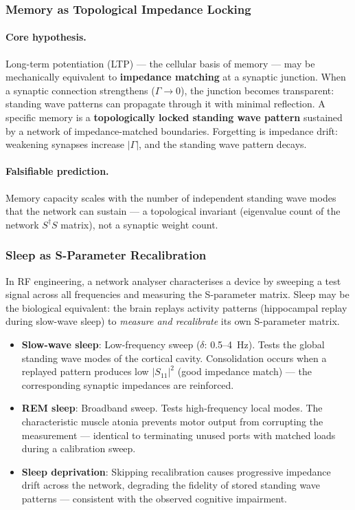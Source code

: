 \subsubsection{Memory as Topological Impedance Locking}
\label{sec:future_memory}

\paragraph{Core hypothesis.}
Long-term potentiation (LTP) --- the cellular basis of
memory --- may be mechanically equivalent to
\textbf{impedance matching} at a synaptic junction.  When
a synaptic connection strengthens ($\Gamma \to 0$), the
junction becomes transparent: standing wave patterns can
propagate through it with minimal reflection.  A specific
memory is a \textbf{topologically locked standing wave
pattern} sustained by a network of impedance-matched
boundaries.  Forgetting is impedance drift: weakening
synapses increase $|\Gamma|$, and the standing wave
pattern decays.

\paragraph{Falsifiable prediction.}
Memory capacity scales with the number of independent
standing wave modes that the network can sustain --- a
topological invariant (eigenvalue count of the network
$S^\dagger S$ matrix), not a synaptic weight count.

\subsubsection{Sleep as S-Parameter Recalibration}
\label{sec:sleep_recalibration}

In RF engineering, a network analyser characterises a
device by sweeping a test signal across all frequencies
and measuring the S-parameter matrix.  Sleep may be the
biological equivalent: the brain replays activity
patterns (hippocampal replay during slow-wave sleep) to
\emph{measure and recalibrate} its own S-parameter matrix.

\begin{itemize}
    \item \textbf{Slow-wave sleep}: Low-frequency sweep
          ($\delta$: 0.5--4~Hz).  Tests the global
          standing wave modes of the cortical cavity.
          Consolidation occurs when a replayed pattern
          produces low $|S_{11}|^2$ (good impedance
          match) --- the corresponding synaptic
          impedances are reinforced.
    \item \textbf{REM sleep}: Broadband sweep.  Tests
          high-frequency local modes.  The characteristic
          muscle atonia prevents motor output from
          corrupting the measurement --- identical to
          terminating unused ports with matched loads
          during a calibration sweep.
    \item \textbf{Sleep deprivation}: Skipping
          recalibration causes progressive impedance
          drift across the network, degrading the
          fidelity of stored standing wave patterns ---
          consistent with the observed cognitive
          impairment.
\end{itemize}


